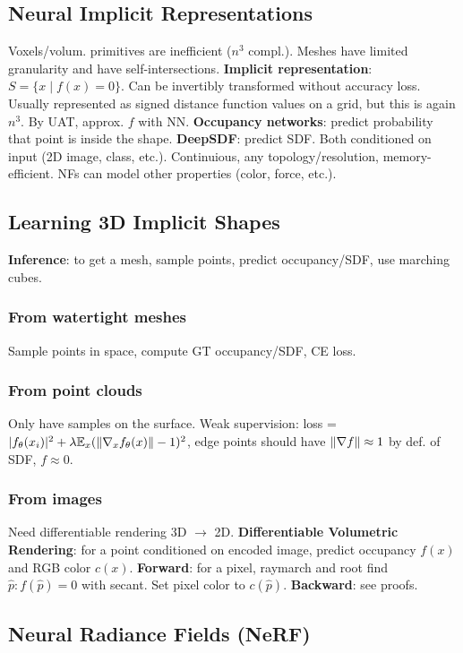\documentclass[11pt,landscape,a4paper,fleqn]{article}
\newcommand{\E}{\mathbb{E}}
\begin{document}
\begin{multicols*}{4}
\section{Neural Implicit Representations}

Voxels/volum. primitives are inefficient ($n^3$ compl.).
Meshes have limited granularity and have self-intersections.
\textbf{Implicit representation}: $S = \{x \mid f(x) = 0\}$.
Can be invertibly transformed without accuracy loss.
Usually represented as signed distance function values on a grid, but this is again $n^3$.
By UAT, approx. $f$ with NN.
\textbf{Occupancy networks}: predict probability that point is inside the shape.
\textbf{DeepSDF}: predict SDF.
Both conditioned on input (2D image, class, etc.).
Continuious, any topology/resolution, memory-efficient.
NFs can model other properties (color, force, etc.).

\subsection{Learning 3D Implicit Shapes}

\textbf{Inference}: to get a mesh, sample points, predict occupancy/SDF, use marching cubes.

\subsubsection{From watertight meshes}
Sample points in space, compute GT occupancy/SDF, CE loss.

\subsubsection{From point clouds} Only have samples on the surface.
Weak supervision: loss = $|f_\theta(x_i)|^2 + \lambda \E_x(\norm{\nabla_x f_\theta(x)} - 1)^2$,
edge points should have $\norm{\nabla f} \approx 1$ by def. of SDF, $f \approx 0$.

\subsubsection{From images} Need differentiable rendering 3D $\to$ 2D.
\textbf{Differentiable Volumetric Rendering}: for a point conditioned on encoded image,
predict occupancy $f(x)$ and RGB color $c(x)$.
\textbf{Forward}: for a pixel, raymarch and root find $\hat{p} : f(\hat{p}) = 0$ with secant. Set pixel color to $c(\hat{p})$.
\textbf{Backward}: see proofs.

\subsection{Neural Radiance Fields (NeRF)} \phantom{a}


\end{multicols*}
\end{document}
